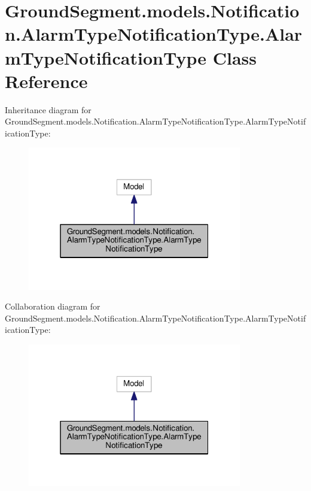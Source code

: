 \hypertarget{class_ground_segment_1_1models_1_1_notification_1_1_alarm_type_notification_type_1_1_alarm_type_notification_type}{}\section{Ground\+Segment.\+models.\+Notification.\+Alarm\+Type\+Notification\+Type.\+Alarm\+Type\+Notification\+Type Class Reference}
\label{class_ground_segment_1_1models_1_1_notification_1_1_alarm_type_notification_type_1_1_alarm_type_notification_type}


Inheritance diagram for Ground\+Segment.\+models.\+Notification.\+Alarm\+Type\+Notification\+Type.\+Alarm\+Type\+Notification\+Type\+:\nopagebreak
\begin{figure}[H]
\begin{center}
\leavevmode
\includegraphics[width=265pt]{class_ground_segment_1_1models_1_1_notification_1_1_alarm_type_notification_type_1_1_alarm_type_669364a24915e31838f70ba6bda3b980}
\end{center}
\end{figure}


Collaboration diagram for Ground\+Segment.\+models.\+Notification.\+Alarm\+Type\+Notification\+Type.\+Alarm\+Type\+Notification\+Type\+:\nopagebreak
\begin{figure}[H]
\begin{center}
\leavevmode
\includegraphics[width=265pt]{class_ground_segment_1_1models_1_1_notification_1_1_alarm_type_notification_type_1_1_alarm_type_notification_type__coll__graph}
\end{center}
\end{figure}
